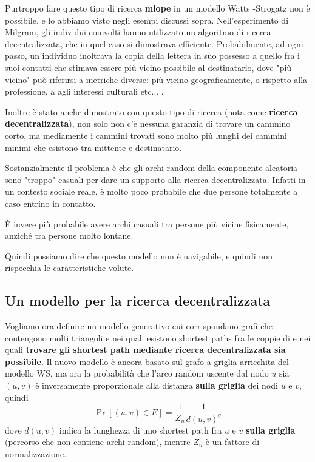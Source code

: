 Purtroppo fare questo tipo di ricerca \textbf{miope} in un modello Watts -Strogatz non è possibile, e lo abbiamo visto negli esempi discussi sopra. Nell'esperimento di Milgram, gli individui coinvolti hanno utilizzato un algoritmo di ricerca decentralizzata, che in quel caso si dimostrava efficiente. Probabilmente, ad ogni passo, un individuo inoltrava la copia della lettera in suo possesso a quello fra i suoi contatti che stimava essere più vicino possibile al destinatario, dove "più vicino" può riferirsi a metriche diverse: più vicino geograficamente, o rispetto alla professione, a agli interessi culturali etc... .

Inoltre è stato anche dimostrato con questo tipo di ricerca (nota come \textbf{ricerca decentralizzata}), non solo non c'è nessuna garanzia di trovare un cammino corto, ma mediamente i cammini trovati sono molto più lunghi dei cammini minimi che esistono tra mittente e destinatario.

Sostanzialmente il problema è che gli archi random della componente aleatoria sono "troppo" casuali per dare un supporto alla ricerca decentralizzata.
Infatti in un contesto sociale reale, è molto poco probabile che due persone totalmente a caso entrino in contatto.

È invece più probabile avere archi casuali tra persone più vicine fisicamente, anziché tra persone molto lontane.

Quindi possiamo dire che questo modello non è navigabile, e quindi non rispecchia le caratteristiche volute.

\subsection{Un modello per la ricerca decentralizzata}

Vogliamo ora definire un modello generativo cui corrispondano grafi che contengono molti triangoli e nei quali esistono shortest paths fra le coppie di e nei quali \textbf{trovare gli shortest path mediante ricerca decentralizzata sia possibile}. Il nuovo modello è ancora basato sul grafo a griglia arricchita del modello WS, ma ora la probabilità che l'arco random uscente dal nodo $u$ sia $(u, v)$ è inversamente proporzionale alla distanza \textbf{sulla griglia} dei nodi $u$ e $v$, quindi
\[
\Pr[(u, v) \in E] = \frac{1}{Z_u} \frac{1}{d(u, v)^q}
\]
dove $d(u, v)$ indica la lunghezza di uno shortest path fra $u$ e $v$ \textbf{sulla griglia} (percorso che non contiene archi random), mentre $Z_u$ è un fattore di normalizzazione.

